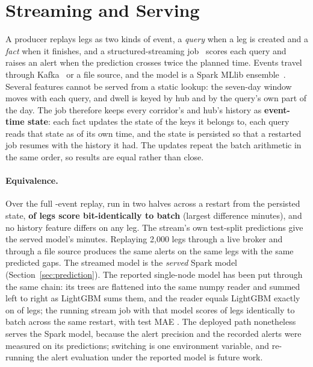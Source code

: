 \section{Streaming and Serving}\label{sec:stream}

A producer replays legs as two kinds of event, a \emph{query} when a leg is created and a \emph{fact} when it finishes, and a structured-streaming job~\cite{armbrust2018structured} scores each query and raises an alert when the prediction crosses twice the planned time. Events travel through Kafka~\cite{kreps2011kafka} or a file source, and the model is a Spark MLlib ensemble~\cite{meng2016mllib}. Several features cannot be served from a static lookup: the seven-day window moves with each query, and dwell is keyed by hub and by the query's own part of the day. The job therefore keeps every corridor's and hub's history as \textbf{event-time state}: each fact updates the state of the keys it belongs to, each query reads that state as of its own time, and the state is persisted so that a restarted job resumes with the history it had. The updates repeat the batch arithmetic in the same order, so results are equal rather than close.

\paragraph{Equivalence.} Over the full \fzStreamEvents{}-event replay, run in two halves across a restart from the persisted state, \textbf{\fzStreamAllLegsIdentical{} of \fzStreamAllLegs{} legs score bit-identically to batch} (largest difference \fzStreamMaxAbsDifference{} minutes), and no history feature differs on any leg. The stream's own test-split predictions give the served model's \fzServedMaeDpTwo{} minutes. Replaying 2,000 legs through a live broker and through a file source produces the same alerts on the same legs with the same predicted gaps. The streamed model is the \emph{served} Spark model (Section~\ref{sec:prediction}). The reported single-node model has been put through the same chain: its trees are flattened into the same numpy reader and summed left to right as LightGBM sums them, and the reader equals LightGBM exactly on \fzLgbmServeIdentical{} of \fzLgbmServeLegs{} legs; the running stream job with that model scores \fzLgbmStreamIdentical{} of \fzLgbmStreamLegs{} legs identically to batch across the same restart, with test MAE \fzLgbmStreamMaeDpTwo{}. The deployed path nonetheless serves the Spark model, because the alert precision and the recorded alerts were measured on its predictions; switching is one environment variable, and re-running the alert evaluation under the reported model is future work.

